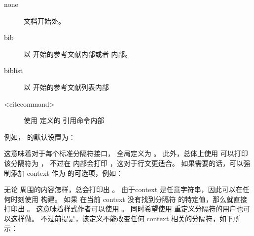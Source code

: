 \begin{description}
	\item[none] %
	文档开始处。
	\item[bib] %
	以  开始的参考文献内部或者  内部。
	\item[biblist] %
	以  开始的参考文献列表内部
	\item[<citecommand>] %
	使用  定义的  引用命令内部
\end{description}

例如， 的默认设置为：

\begin{ltxexample}[style=latex]{}
\end{ltxexample}
%
这意味着对于每个标准分隔符接口， 全局定义为 。
此外，总体上使用  可以打印该分隔符为 ，
不过在  内部会打印 ，这对于行文更适合。
如果需要的话，可以强制添加 context 作为 的可选项，例如：

\begin{ltxexample}[style=latex]{}
\end{ltxexample}
%
无论  周围的内容怎样，总会打印出 。
由于context 是任意字符串，因此可以在任何时刻使用  构建。
如果  在当前 context 没有找到分隔符  的特定值，那么就直接打印出 。
这意味着样式作者可以使用 。
同时希望使用  重定义分隔符的用户也可以这样做。
不过前提是，该定义不能改变任何 context 相关的分隔符，如下所示：

